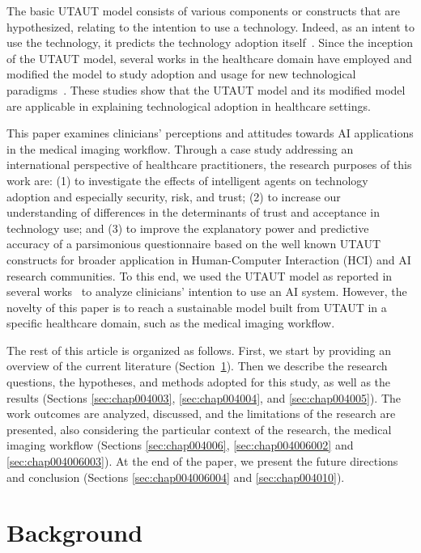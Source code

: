 The basic UTAUT model consists of various components or constructs that are hypothesized, relating to the intention to use a technology.
Indeed, as an intent to use the technology, it predicts the technology adoption itself~\cite{DEANGELI2020102412, HART201993, Zhang2022}.
Since the inception of the UTAUT model, several works in the healthcare domain have employed and modified the model to study adoption and usage for new technological paradigms~\cite{KALAVANI2018287}.
These studies show that the UTAUT model and its modified model are applicable in explaining technological adoption in healthcare settings.

This paper examines clinicians' perceptions and attitudes towards AI applications in the medical imaging workflow.
Through a case study addressing an international perspective of healthcare practitioners, the research purposes of this work are:
(1) to investigate the effects of intelligent agents on technology adoption and especially security, risk, and trust;
(2) to increase our understanding of differences in the determinants of trust and acceptance in technology use; and
(3) to improve the explanatory power and predictive accuracy of a parsimonious questionnaire based on the well known UTAUT constructs for broader application in Human-Computer Interaction (HCI) and AI research communities.
To this end, we used the UTAUT model as reported in several works~\cite{BOOTSMAN201999, DEANGELI2020102412, HART201993, HOEHLE201635, LOOIJE2010386, MCGLYNN201733, MOORE2022102784} to analyze clinicians' intention to use an AI system.
However, the novelty of this paper is to reach a sustainable model built from UTAUT in a specific healthcare domain, such as the medical imaging workflow.

The rest of this article is organized as follows.
First, we start by providing an overview of the current literature (Section~\ref{sec:chap004002}).
Then we describe the research questions, the hypotheses, and methods adopted for this study, as well as the results (Sections \ref{sec:chap004003}, \ref{sec:chap004004}, and \ref{sec:chap004005}).
The work outcomes are analyzed, discussed, and the limitations of the research are presented, also considering the particular context of the research, the medical imaging workflow (Sections \ref{sec:chap004006}, \ref{sec:chap004006002} and \ref{sec:chap004006003}).
At the end of the paper, we present the future directions and conclusion (Sections \ref{sec:chap004006004} and \ref{sec:chap004010}).

\section{Background}
\label{sec:chap004002}

